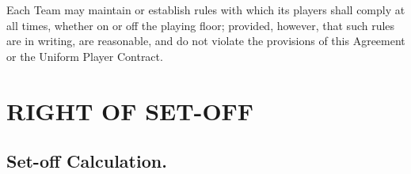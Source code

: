 \documentclass[
]{book}
\begin{document}
Each Team may maintain or establish rules with which its players shall comply at all times, whether on or off the playing floor; provided, however, that such rules are in writing, are reasonable, and do not violate the provisions of this Agreement or the Uniform Player Contract.

\hypertarget{right-of-set-off}{%
\chapter{RIGHT OF SET-OFF}\label{right-of-set-off}}

\hypertarget{set-off-calculation.}{%
\section{Set-off Calculation.}\label{set-off-calculation.}}
\end{document}
